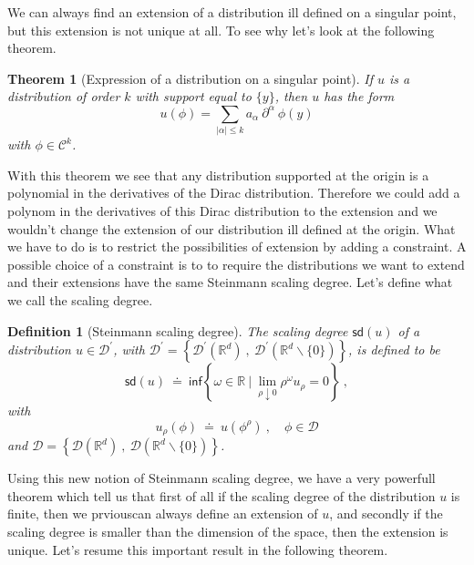 \documentclass[10pt]{book}
\newcommand{\sd}{\mathsf{sd}}
\newcommand{\abs}[1]{\left|#1\right|}
\renewcommand{\inf}{\mathsf{inf}}
\newcommand{\Ccal}{\mathcal{C}}
\newcommand{\Dcal}{\mathcal{D}}
\newcommand{\Rbb}{\mathbb{R}}
\theoremstyle{break}
\newtheorem{theorem}{Theorem}
\newtheorem{definition}{Definition}
\begin{document}
We can always find an extension of a distribution ill defined on a singular point, but this extension is not unique at all. To see why let's look at the following theorem.

\begin{theorem}[Expression of a distribution on a singular point]
 If $u$ is a distribution of order $k$ with support equal to $\{y\}$, then $u$ has the form 
 \begin{equation*}
  u(\phi) = \sum_{\abs{\alpha} \leq k} a_\alpha \ \partial^\alpha \ \phi(y) 
 \end{equation*}
 with $\phi \in \Ccal^k$. 
\end{theorem}

With this theorem we see that any distribution supported at the origin is a polynomial in the derivatives of the Dirac distribution. Therefore we could add a polynom in the derivatives of this Dirac distribution to the extension and we wouldn't change the extension of our distribution ill defined at the origin. What we have to do is to restrict the possibilities of extension by adding a constraint. A possible choice of a constraint is to to require the distributions we want to extend and their extensions have the same Steinmann scaling degree. Let's define what we call the scaling degree.

\begin{definition}[Steinmann scaling degree] 
 The scaling degree $\sd(u)$ of a distribution $u \in \Dcal^\prime$, with $\Dcal^\prime = \left\{\Dcal^\prime(\Rbb^d) \ , \ \Dcal^\prime\left(\Rbb^d \backslash \{0\}\right)  \right\}$, is defined to be
 \begin{equation*}
  \sd(u) \ \doteq \ \inf \left\{ \omega \in \Rbb \ \bigg| \ \lim_{\rho \downarrow 0} \rho^{\omega} u_{\rho} = 0 \right\} \ ,  
 \end{equation*}
 with 
 \begin{equation*}
  u_\rho(\phi) \ \doteq \ u(\phi^\rho) \ , \quad \phi \in \Dcal
 \end{equation*}
 and $\Dcal = \left\{\Dcal(\Rbb^d) \ , \ \Dcal\left(\Rbb^d \backslash \{0\}\right)  \right\}$. 
\end{definition}

Using this new notion of Steinmann scaling degree, we have a very powerfull theorem  which tell us that first of all if the scaling degree of the distribution $u$ is finite, then we prviouscan always define an extension of $u$, and secondly if the scaling degree is smaller than the dimension of the space, then the extension is unique. Let's resume this important result in the following theorem.
\end{document}
